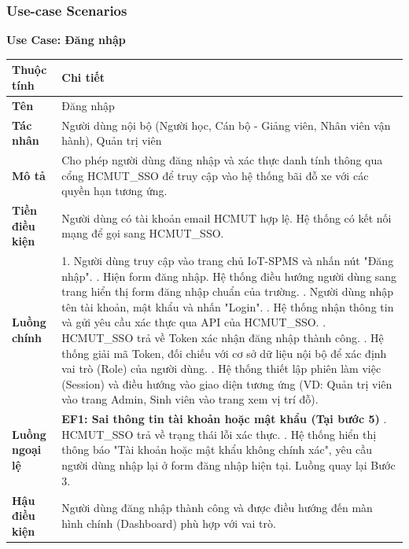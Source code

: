 \subsubsection{Use-case Scenarios}

\noindent \textbf{Use Case: Đăng nhập} \\
\renewcommand{\arraystretch}{1.6}
\begin{xltabular}{\textwidth}{|l|X|}
\hline
\textbf{Thuộc tính} & \textbf{Chi tiết} \\
\hline
\textbf{Tên} & Đăng nhập \\
\hline
\textbf{Tác nhân} & Người dùng nội bộ (Người học, Cán bộ - Giảng viên, Nhân viên vận hành), Quản trị viên \\
\hline
\textbf{Mô tả} & Cho phép người dùng đăng nhập và xác thực danh tính thông qua cổng HCMUT\_SSO để truy cập vào hệ thống bãi đỗ xe với các quyền hạn tương ứng. \\
\hline
\textbf{Tiền điều kiện} & Người dùng có tài khoản email HCMUT hợp lệ. Hệ thống có kết nối mạng để gọi sang HCMUT\_SSO. \\
\hline
\textbf{Luồng chính} & 
1. Người dùng truy cập vào trang chủ IoT-SPMS và nhấn nút "Đăng nhập". . Hiện form đăng nhập. Hệ thống điều hướng người dùng sang trang hiển thị form đăng nhập chuẩn của trường. . Người dùng nhập tên tài khoản, mật khẩu và nhấn "Login". . Hệ thống nhận thông tin và gửi yêu cầu xác thực qua API của HCMUT\_SSO. . HCMUT\_SSO trả về Token xác nhận đăng nhập thành công. . Hệ thống giải mã Token, đối chiếu với cơ sở dữ liệu nội bộ để xác định vai trò (Role) của người dùng. . Hệ thống thiết lập phiên làm việc (Session) và điều hướng vào giao diện tương ứng (VD: Quản trị viên vào trang Admin, Sinh viên vào trang xem vị trí đỗ).\\
\hline
\textbf{Luồng ngoại lệ} & 
\textbf{EF1: Sai thông tin tài khoản hoặc mật khẩu (Tại bước 5)} . HCMUT\_SSO trả về trạng thái lỗi xác thực. . Hệ thống hiển thị thông báo "Tài khoản hoặc mật khẩu không chính xác", yêu cầu người dùng nhập lại ở form đăng nhập hiện tại. Luồng quay lại Bước 3. \\
\hline
\textbf{Hậu điều kiện} & Người dùng đăng nhập thành công và được điều hướng đến màn hình chính (Dashboard) phù hợp với vai trò. \\
\hline
\end{xltabular}

